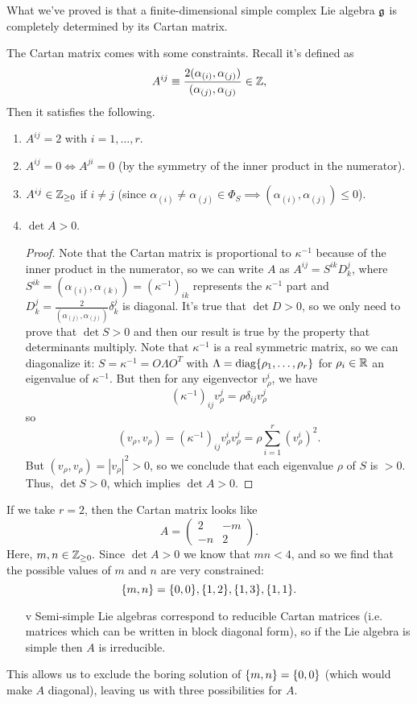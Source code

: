 What we've proved is that a finite-dimensional simple complex Lie algebra $\mathfrak{g}$ is completely determined by its Cartan matrix.

The Cartan matrix comes with some constraints. Recall it's defined as
$$A^{ij}\equiv \frac{2(\alpha_{(i)}, \alpha_{(j)})} {(\alpha_{(j)},\alpha_{(j)}}\in \mathbb{Z},$$
Then it satisfies the following.
\begin{enumerate}
    \item $A^{ij}=2$ with $i=1,\ldots,r$.
    \item $A^{ij}=0 \iff A^{ji}=0$ (by the symmetry of the inner product in the numerator).
    \item $A^{ij}\in \mathbb{Z}_{\geq 0}$ if $i\neq j$ (since $\alpha_{(i)}\neq \alpha_{(j)} \in \Phi_S \implies (\alpha_{(i)},\alpha_{(j)})\leq 0$).
    \item $\det A > 0$. \begin{proof}
    Note that the Cartan matrix is proportional to $\kappa^{-1}$ because of the inner product in the numerator, so we can write $A$ as $A^{ij}=S^{ik} D_k^j$, where $S^{ik}=(\alpha_{(i)},\alpha_{(k)})=(\kappa^{-1})_{ik}$ represents the $\kappa^{-1}$ part and $D_k^j = \frac{2}{(\alpha_{(j)},\alpha_{(j)})}\delta_k^j$ is diagonal. It's true that $\det D >0$, so we only need to prove that $\det S >0$ and then our result is true by the property that determinants multiply. Note that $\kappa^{-1}$ is a real symmetric matrix, so we can diagonalize it: $S=\kappa^{-1}=O\Lambda O^T$ with $\Lambda = \text{diag}\{\rho_1,\ldots,\rho_r\}$ for $\rho_i\in \mathbb{R}$ an eigenvalue of $\kappa^{-1}.$ But then for any eigenvector $v_\rho^i$, we have
    $$(\kappa^{-1})_{ij}v_\rho^j = \rho \delta_{ij} v^j_\rho$$
    so
    $$(v_\rho,v_\rho)=(\kappa^{-1})_{ij} v_\rho^i v_\rho^j = \rho \sum_{i=1}^r (v_\rho^i)^2.$$ But $(v_\rho,v_\rho)= |v_\rho|^2 >0$, so we conclude that each eigenvalue $\rho$ of $S$ is $>0$. Thus, $\det S>0$, which implies $\det A >0$.
    \end{proof}
\end{enumerate}

\begin{exm}
If we take $r=2$, then the Cartan matrix looks like
$$A=\begin{pmatrix}
2&-m\\-n &2
\end{pmatrix}.$$
Here, $m,n\in \mathbb{Z}_{\geq 0}.$ Since $\det A >0$ we know that $mn <4$, and so we find that the possible values of $m$ and $n$ are very constrained:
$$\{m,n\}=\{0,0\},\{1,2\},\{1,3\},\{1,1\}.$$
\end{exm}
\begin{enumerate}
    \item[v] Semi-simple Lie algebras correspond to reducible Cartan matrices (i.e. matrices which can be written in block diagonal form), so if the Lie algebra is simple then $A$ is irreducible.
\end{enumerate}
This allows us to exclude the boring solution of $\{m,n\}=\{0,0\}$ (which would make $A$ diagonal), leaving us with three possibilities for $A$.

